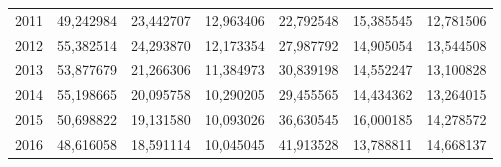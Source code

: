 \begin{table}
\begin{tabular}{p{1cm}p{2cm}p{2cm}p{2cm}p{2cm}p{2cm}p{2cm}}
 2011 &       49,242984 &           23,442707 &                                          12,963406 &         22,792548 &                      15,385545 & 12,781506 \\
 2012 &       55,382514 &           24,293870 &                                          12,173354 &         27,987792 &                      14,905054 & 13,544508 \\
 2013 &       53,877679 &           21,266306 &                                          11,384973 &         30,839198 &                      14,552247 & 13,100828 \\
 2014 &       55,198665 &           20,095758 &                                          10,290205 &         29,455565 &                      14,434362 & 13,264015 \\
 2015 &       50,698822 &           19,131580 &                                          10,093026 &         36,630545 &                      16,000185 & 14,278572 \\
 2016 &       48,616058 &           18,591114 &                                          10,045045 &         41,913528 &                      13,788811 & 14,668137 \\
\bottomrule
\end{tabular}
\end{table}
